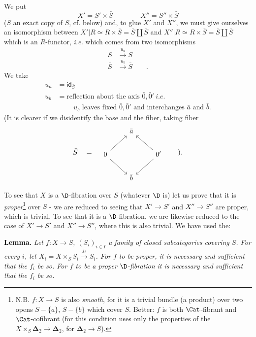 
We put
\[ X' = S' \times \bar S \qquad\qquad X'' = S'' \times \bar S \]
($\bar S$ an exact copy of $S$, cf. below) and, to glue $X'$ and $X''$, we must give ourselves an isomorphism between $X'|R \simeq R \times \bar S = \bar S \amalg \bar S$ and $X''|R \simeq R \times \bar S = \bar S \amalg \bar S$ which is an $R$-functor, \textit{i.e.} which comes from two isomorphisms
\[
\begin{aligned}
\bar S &\xrightarrow{u_a} \bar S \\
\bar S &\xrightarrow{u_b} \bar S \qquad .
\end{aligned}
\]
We take
\[
\begin{aligned}
u_a &= \mathsf{id}_{\bar S} \\
u_b &= \text{reflection about the axis } \bar 0, \bar 0' \ \textit{i.e.} %
\\
&\phantom{=}\quad u_b \text{ leaves fixed } \bar 0, \bar 0' \text{ and interchanges } \bar a \text{ and } \bar b.
\end{aligned}
\]
(It is clearer if we disidentify the base and the fiber, taking fiber
\[
\bar S \quad = \quad
\begin{tikzcd}
 & \bar a & \\
\bar 0 \arrow[ur] \arrow[dr] & & \bar 0' \arrow[ul] \arrow[dl] \\
 & \bar b &
\end{tikzcd}
\qquad ).
\]

To see that $X$ is a $\D$-fibration over $S$ (whatever $\D$ is) let us prove that it is \textit{proper}\footnote[45]{N.B. $f : X \to S$ is also \textit{smooth}, for it is a trivial bundle (a product) over two opens $S - \{a\}$, $S - \{b\}$ which cover $S$. Better: $f$ is both $\Cat$-fibrant and $\Cat$-cofibrant (for this condition uses only the properties of the $X \times_S \boldsymbol{\Delta}_2 \to \boldsymbol{\Delta}_2$, for $\boldsymbol{\Delta}_2 \to S$).} over $S$ - we are reduced to seeing that $X' \to S'$ and $X'' \to S''$ are proper, which is trivial. To see that it is a $\D$-fibration, we are likewise reduced to the case of $X' \to S'$ and $X'' \to S''$, where this is also trivial. We have used the: %

\textbf{Lemma.} \textit{Let $f : X \to S$, $(S_i)_{i \in I}$ a family of closed subcategories covering $S$. For every $i$, let $X_i = X \times_S S_i \xrightarrow{f_i} S_i$. For $f$ to be proper, it is necessary and sufficient that the $f_i$ be so. For $f$ to be a proper $\D$-fibration it is necessary and sufficient that the $f_i$ be so.}

